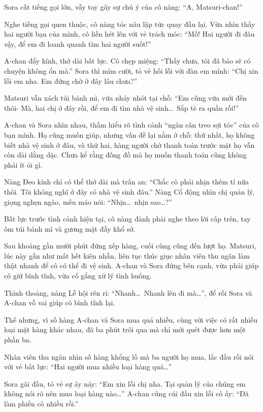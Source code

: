 \documentclass[../main.tex]{subfiles}
\begin{document}
Sora cất tiếng gọi lớn, vẫy tay gây sự chú ý của cô nàng: ``A, Matsuri-chan!''

Nghe tiếng gọi quen thuộc, cô nàng tóc nâu lập tức quay đầu lại. Vừa nhìn thấy hai người bạn của mình, cô liền hét lên với vẻ trách móc: ``Mồ! Hai người đi đâu vậy, để em đi loanh quanh tìm hai người suốt!''

A-chan đẩy kính, thở dài bất lực. Cô chẹp miệng: ``Thấy chưa, tôi đã bảo sẽ có chuyện không ổn mà.'' Sora thì mỉm cười, tỏ vẻ hối lỗi với đàn em mình: ``Chị xin lỗi em nha. Em đứng chờ ở đây lâu chưa?''

Matsuri vẫn xách túi bánh mì, vừa nhảy nhót tại chỗ: ``Em cũng vừa mới đến thôi- Mà, hai chị ở đây rồi, để em đi tìm nhà vệ sinh\dots\ Sắp tè ra quần rồi!''

A-chan và Sora nhìn nhau, thầm hiểu rõ tình cảnh ``ngàn cân treo sợi tóc'' của cô bạn mình. Họ cũng muốn giúp, nhưng vấn đề lại nằm ở chỗ: thứ nhất, họ không biết nhà vệ sinh ở đâu, và thứ hai, hàng người chờ thanh toán trước mặt họ vẫn còn dài dằng dặc. Chưa kể rằng đống đồ mà họ muốn thanh toán cũng không phải ít ỏi gì.

Nàng Đeo kính chỉ có thể thở dài mà trấn an: ``Chắc cô phải nhịn thêm tí nữa thôi. Tôi không nghĩ ở đây có nhà vệ sinh đâu.'' Nàng Cổ động nhìn chị quản lý, giọng nghẹn ngào, mếu máo nói: ``Nhịn\dots\ nhịn sao\dots?''

Bất lực trước tình cảnh hiện tại, cô nàng đành phải nghe theo lời cấp trên, tay ôm túi bánh mì và gương mặt đầy khổ sở.

\ct

Sau khoảng gần mười phút đứng xếp hàng, cuối cùng cũng đến lượt họ. Matsuri, lúc này gần như mất hết kiên nhẫn, liên tục thúc giục nhân viên thu ngân làm thật nhanh để cô có thể đi vệ sinh. A-chan và Sora đứng bên cạnh, vừa phải giúp cô giữ bình tĩnh, vừa cố gắng xử lý tình huống.

Thỉnh thoảng, nàng Lễ hội rên rỉ: ``Nhanh\dots\ Nhanh lên đi mà\dots'', để rồi Sora và A-chan vỗ vai giúp cô bình tĩnh lại.

Thế nhưng, vì số hàng A-chan và Sora mua quá nhiều, cùng với việc có rất nhiều loại mặt hàng khác nhau, đã ba phút trôi qua mà chỉ mới quét được hơn một phần ba.

Nhân viên thu ngân nhìn số hàng khổng lồ mà ba người họ mua, lắc đầu rồi nói với vẻ bất lực: ``Hai người mua nhiều loại hàng quá\dots''

Sora gãi đầu, tỏ vẻ sự áy náy: ``Em xin lỗi chị nha. Tại quản lý của chúng em không nói rõ nên mua loại hàng nào\dots'' A-chan cũng cúi đầu xin lỗi cô ấy: ``Đã làm phiền cô nhiều rồi.''
\end{document}
